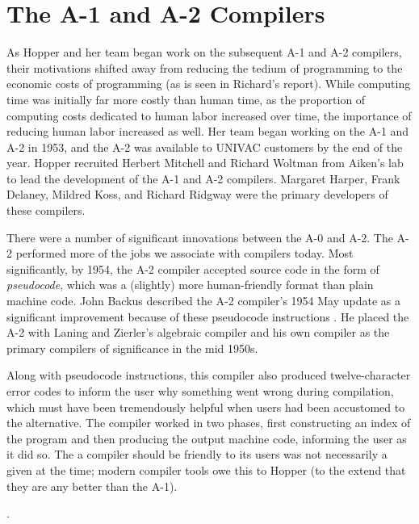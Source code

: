 \section{The A-1 and A-2 Compilers}

As Hopper and her team began work on the subsequent A-1 and A-2 compilers,
their motivations shifted away from reducing the tedium of programming to the
economic costs of programming (as is seen in Richard's report).
While computing time was initially far more
costly than human time, as the proportion of computing costs dedicated to human
labor increased over time, the importance of reducing human labor increased as
well.
Her team began working on the A-1 and A-2 in 1953, and the A-2 was
available to UNIVAC customers by the end of the year.
Hopper recruited Herbert Mitchell and Richard Woltman from Aiken's
lab to lead the development of the A-1 and A-2 compilers.
Margaret Harper, Frank Delaney, Mildred Koss, and Richard Ridgway were
the primary developers of these compilers.

There were a number of significant innovations between the A-0 and A-2.
The A-2 performed more of the jobs we associate with compilers today.
Most significantly, by 1954, the A-2 compiler accepted source code
in the form of \textit{pseudocode}, which was a (slightly) more human-friendly
format than plain machine code.
John Backus described the A-2 compiler's 1954 May update as a significant
improvement because of these pseudocode instructions
\cite{hopl_backus_history_of_fortran}.
He placed the A-2 with Laning and Zierler's algebraic compiler and
his own \FTNI{} compiler as the primary compilers of significance in the
mid 1950s.

Along with pseudocode instructions, this compiler also produced
twelve-character error codes to inform the user why something went wrong
during compilation, which must have been tremendously helpful when users
had been accustomed to the alternative.
The compiler worked in two phases, first constructing an index of the
program and then producing the output machine code, informing the user as
it did so.
The a compiler should be friendly to its users was not necessarily a given at
the time; modern compiler tools owe this to Hopper (to the extend that they
are any better than the A-1).

.

